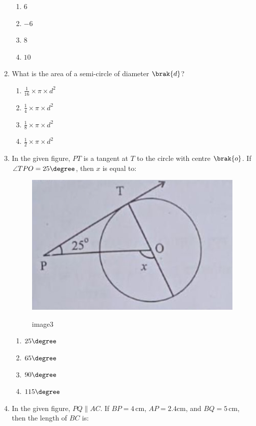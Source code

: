 \begin{enumerate}
\begin{enumerate}
	\item $6$
	\item $-6$
	\item $8$
	\item $10$
\end{enumerate}
\item What is the area of a semi-circle of diameter $\brak{d}$?
\begin{enumerate}
    \item $\frac{1}{16} \times \pi \times d^2$
    \item $\frac{1}{4} \times \pi \times d^2$
    \item $\frac{1}{8} \times \pi \times d^2$
    \item $\frac{1}{2} \times \pi \times d^2$
\end{enumerate}
\item In the given figure, $PT$ is a tangent at $T$ to the circle with centre $\brak{o}$. If $\angle TPO = 25\degree$, then $x$ is equal to:
\begin{figure}[!ht]
\centering
\includegraphics[width=\columnwidth]{figs/image 3.jpg}
\label{fig:image1}
        \caption{image3}
\end{figure}
\begin{enumerate}
    \item $25\degree$
    \item $65\degree$
    \item $90\degree$
    \item $115\degree$
\end{enumerate}
\newpage
\item In the given figure, $PQ \parallel AC$. If $BP = 4 \, \mathrm{cm}$, $AP = 2.4 \mathrm{cm}$, and $BQ = 5 \, \mathrm{cm}$, then the length of $BC$ is:

\end{enumerate}
